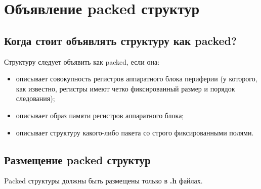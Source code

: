 \section{Объявление packed структур}\label{struct:p}
\subsection{Когда стоит объявлять структуру как packed?}
Структуру следует объявить как packed, если она:
\begin{itemize}
	\item описывает совокупность регистров аппаратного блока периферии (у которого, как известно, регистры имеют четко фиксированный размер и порядок следования);
	\item описывает образ памяти регистров аппаратного блока;
	\item описывает структуру какого-либо пакета со строго фиксированными полями.
\end{itemize}

\subsection{Размещение packed структур}
Packed структуры должны быть размещены только в \textbf{.h} файлах. 


